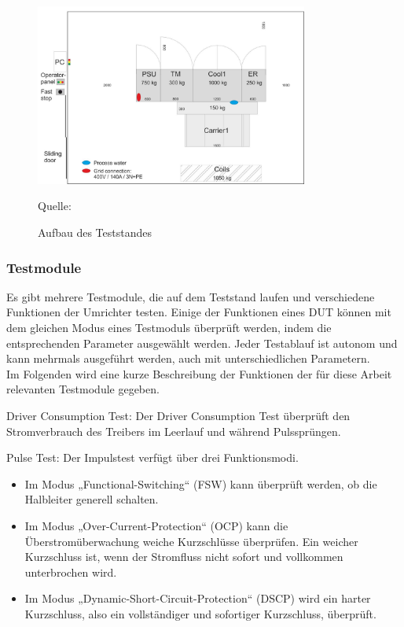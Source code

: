 \begin{figure}[h]
    \centering
    \includegraphics[width=0.8\textwidth]{Grafiken/Test Cabin.jpg}
    \caption{Aufbau des Teststandes}
    \label{fig:1. Aufbau des Teststandes}
    {Quelle: \cite*[7]{Main_Manuel_USTB2018}}
\end{figure}


\subsubsection{Testmodule}
Es gibt mehrere Testmodule, die auf dem Teststand laufen und verschiedene Funktionen der Umrichter testen.
Einige der Funktionen eines DUT können mit dem gleichen Modus eines Testmoduls überprüft werden, indem die entsprechenden Parameter ausgewählt werden.
Jeder Testablauf ist autonom und kann mehrmals ausgeführt werden, auch mit unterschiedlichen Parametern.
\\
Im Folgenden wird eine kurze Beschreibung der Funktionen der für diese Arbeit relevanten Testmodule gegeben.

Driver Consumption Test:
Der Driver Consumption Test überprüft den Stromverbrauch des Treibers im Leerlauf und während Pulssprüngen.

Pulse Test:
Der Impulstest verfügt über drei Funktionsmodi.
\begin{itemize}
    \item Im Modus „Functional-Switching“ (FSW) kann überprüft werden, ob die Halbleiter generell schalten.
    \item Im Modus „Over-Current-Protection“ (OCP) kann die Überstromüberwachung weiche Kurzschlüsse überprüfen.
    Ein weicher Kurzschluss ist, wenn der Stromfluss nicht sofort und vollkommen unterbrochen wird.
    \item Im Modus „Dynamic-Short-Circuit-Protection“ (DSCP) wird ein harter Kurzschluss, also ein vollständiger und sofortiger Kurzschluss, überprüft.
\end{itemize}

